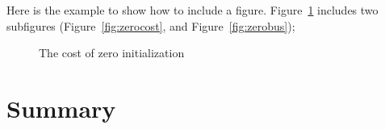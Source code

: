 Here is the example to show how to include a figure. Figure~\ref{fig:cost}
includes two subfigures (Figure~\ref{fig:zerocost}, and Figure~\ref{fig:zerobus});

\begin{figure}
  \label{fig:cost}
  \caption{The cost of zero initialization}
\end{figure}


\section{Summary}
